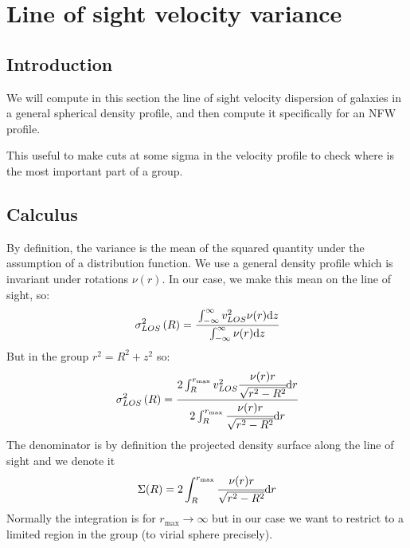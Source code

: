 %
\chapter{Line of sight velocity variance}
%
\section{Introduction}
%
We will compute in this section the line of sight velocity dispersion of
galaxies in a general spherical density profile, and then compute it
specifically for an NFW profile.

This useful to make cuts at some sigma in the velocity profile to check where
is the most important part of a group.
%
\section{Calculus}
%
By definition, the variance is the mean of the squared quantity under the
assumption of a distribution function. We use a general density profile which
is invariant under rotations $\nu{(r)}$. In our case, we make this mean on the
line of sight, so:
%
\begin{equation}
    \sigma_{LOS}^2\left({R}\right)=\cfrac{\int_{-\infty}^{\infty}{v_{LOS}^2}\nu{(r)}{\rm{d}}{z}}
    {\int_{-\infty}^{\infty}\nu{(r)}{\rm{d}}{z}}
\end{equation}
%
But in the group $r^2=R^2+z^2$ so:
%
\begin{equation}
    \sigma_{LOS}^2\left({R}\right)=\cfrac{2\int_{R}^{r_{\max}}{v_{LOS}^2}\cfrac{\nu{(r)}{r}}{\sqrt{r^2-R^2}}{\rm{d}}{r}}
    {2\int_{R}^{r_{\max}}\cfrac{\nu{(r)}{r}}{\sqrt{r^2-R^2}}{\rm{d}}{r}}
\end{equation}
%
The denominator is by definition the projected density surface along the line
of sight and we denote it
%
\begin{equation}
    \Sigma(R) = 2\int_{R}^{r_{\max}}\cfrac{\nu{(r)}{r}}{\sqrt{r^2-R^2}}{\rm{d}}{r}
\end{equation}
%
Normally the integration is for $r_{\max}\rightarrow\infty$ but in our
case we want to restrict to a limited region in the group (to virial sphere
precisely).

